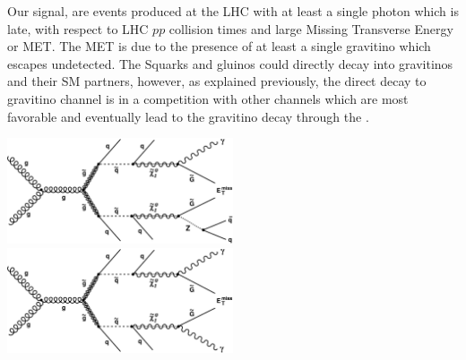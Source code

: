 \newline
Our signal, are events produced at the LHC with at least a single photon which is late, with respect to LHC $pp$ collision times and large Missing Transverse Energy or MET. The MET is due to the presence of at least a single gravitino which escapes undetected.
\newline
The Squarks and gluinos could directly decay into gravitinos and their SM partners, however, as explained previously, the direct decay to gravitino channel is in a competition with other channels which are most favorable and eventually lead to the gravitino decay through the \PSneutralinoOne.

\vspace{5mm}
\begin{minipage}{0.90\linewidth}
\begin{center}
\centering
\mbox{\includegraphics[height=0.7\textwidth, width=0.5\textwidth]{THESISPLOTS/SinglePhoton_gluino.pdf} \quad \quad
\includegraphics[height=0.7\textwidth, width=0.5\textwidth]{THESISPLOTS/Diphoton_gluino.pdf}} \\

\end{center}
\end{minipage}
